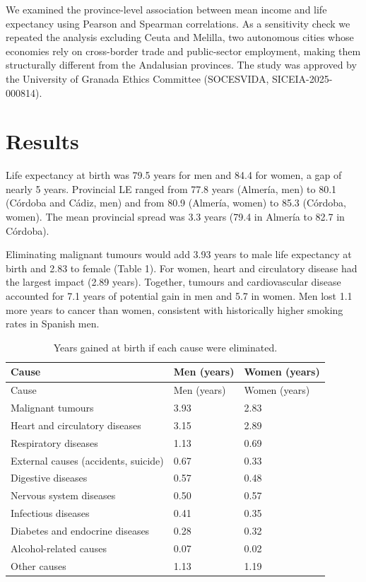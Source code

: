 \documentclass[
  11pt,
  a4paper,
]{article}
\begin{document}
We examined the province-level association between mean income and life
expectancy using Pearson and Spearman correlations. As a sensitivity
check we repeated the analysis excluding Ceuta and Melilla, two
autonomous cities whose economies rely on cross-border trade and
public-sector employment, making them structurally different from the
Andalusian provinces. The study was approved by the University of
Granada Ethics Committee (SOCESVIDA, SICEIA-2025-000814).

\section{Results}\label{results}

Life expectancy at birth was 79.5 years for men and 84.4 for women, a
gap of nearly 5 years. Provincial LE ranged from 77.8 years (Almería,
men) to 80.1 (Córdoba and Cádiz, men) and from 80.9 (Almería, women) to
85.3 (Córdoba, women). The mean provincial spread was 3.3 years (79.4 in
Almería to 82.7 in Córdoba).

Eliminating malignant tumours would add 3.93 years to male life
expectancy at birth and 2.83 to female (Table 1). For women, heart and
circulatory disease had the largest impact (2.89 years). Together,
tumours and cardiovascular disease accounted for 7.1 years of potential
gain in men and 5.7 in women. Men lost 1.1 more years to cancer than
women, consistent with historically higher smoking rates in Spanish men.

\begin{longtable}[]{@{}lll@{}}
\caption{Years gained at birth if each cause were
eliminated.}\tabularnewline
\toprule\noalign{}
Cause & Men (years) & Women (years) \\
\midrule\noalign{}
\endfirsthead
\toprule\noalign{}
Cause & Men (years) & Women (years) \\
\midrule\noalign{}
\endhead
\bottomrule\noalign{}
\endlastfoot
Malignant tumours & 3.93 & 2.83 \\
Heart and circulatory diseases & 3.15 & 2.89 \\
Respiratory diseases & 1.13 & 0.69 \\
External causes (accidents, suicide) & 0.67 & 0.33 \\
Digestive diseases & 0.57 & 0.48 \\
Nervous system diseases & 0.50 & 0.57 \\
Infectious diseases & 0.41 & 0.35 \\
Diabetes and endocrine diseases & 0.28 & 0.32 \\
Alcohol-related causes & 0.07 & 0.02 \\
Other causes & 1.13 & 1.19 \\
\end{longtable}
\end{document}
